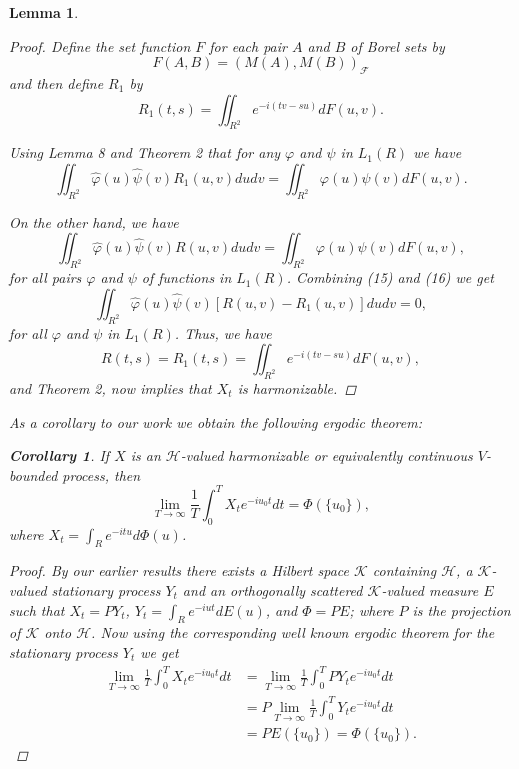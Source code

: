 \documentclass{article}
\newtheorem{lemma}[theorem]{Lemma}
\newtheorem{corollary}[theorem]{Corollary}
\begin{document}
\begin{lemma}
\begin{enumerate}
\begin{proof}
Define the set function $F$ for each pair $A$ and $B$ of Borel sets by
\begin{equation}
F(A, B) = (M(A), M(B))_{\mathscr{F}}
\end{equation}
and then define $R_1$ by
\begin{equation}
R_1(t, s) = \iint_{R^2} e^{-i(tv-su)} dF(u, v).
\end{equation}

Using Lemma 8 and Theorem 2 that for any $\varphi$ and $\psi$ in $L_1(R)$ we have
\begin{equation}
\iint_{R^2} \hat{\varphi}(u)\hat{\psi}(v)R_1(u, v)du dv = \iint_{R^2} \varphi(u)\psi(v)dF(u, v).
\end{equation}

On the other hand, we have
\begin{equation}
\iint_{R^2} \hat{\varphi}(u)\hat{\psi}(v)R(u, v)du dv = \iint_{R^2} \varphi(u)\psi(v)dF(u, v),
\end{equation}
for all pairs $\varphi$ and $\psi$ of functions in $L_1(R)$. Combining (15) and (16) we get
\begin{equation}
\iint_{R^2} \hat{\varphi}(u)\hat{\psi}(v)[R(u, v) - R_1(u, v)]du dv = 0,
\end{equation}
for all $\varphi$ and $\psi$ in $L_1(R)$. Thus, we have
\begin{equation}
R(t, s) = R_1(t, s) = \iint_{R^2} e^{-i(tv-su)} dF(u, v),
\end{equation}
and Theorem 2, now implies that $X_t$ is harmonizable.
\end{proof}

As a corollary to our work we obtain the following ergodic theorem:

\begin{corollary}
If $X$ is an $\mathscr{H}$-valued harmonizable or equivalently continuous $V$-bounded process, then
\begin{equation}
\lim_{T\to\infty} \frac{1}{T} \int_0^T X_t e^{-iu_0 t} dt = \Phi(\{u_0\}),
\end{equation}
where $X_t = \int_R e^{-itu} d\Phi(u)$.
\end{corollary}

\begin{proof}
By our earlier results there exists a Hilbert space $\mathscr{K}$ containing $\mathscr{H}$, a $\mathscr{K}$-valued stationary process $Y_t$ and an orthogonally scattered $\mathscr{K}$-valued measure $E$ such that $X_t = PY_t$, $Y_t = \int_R e^{-iut} dE(u)$, and $\Phi = PE$; where $P$ is the projection of $\mathscr{K}$ onto $\mathscr{H}$. Now using the corresponding well known ergodic theorem for the stationary process $Y_t$ we get
\begin{align}
\lim_{T\to\infty} \frac{1}{T} \int_0^T X_t e^{-iu_0 t} dt &= \lim_{T\to\infty} \frac{1}{T} \int_0^T PY_t e^{-iu_0 t} dt\\
&= P \lim_{T\to\infty} \frac{1}{T} \int_0^T Y_t e^{-iu_0 t} dt\\
&= P E(\{u_0\}) = \Phi(\{u_0\}).
\end{align}
\end{proof}


\end{enumerate}
\end{lemma}
\end{document}
